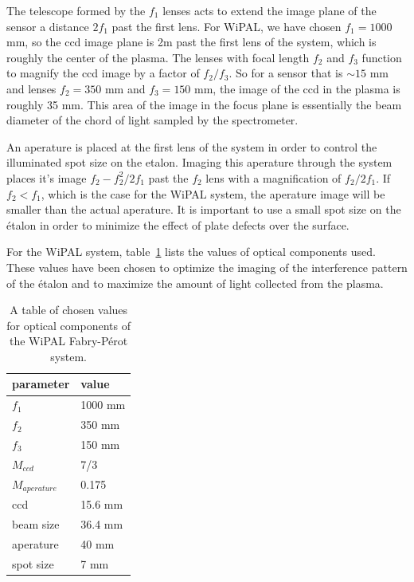 \documentclass{article}
\begin{document}
The telescope formed by the $f_{1}$ lenses acts to extend the image plane of the sensor a distance $2f_{1}$ past the first lens. For WiPAL, we have chosen $f_{1}=1000$ mm, so the ccd image plane is 2m past the first lens of the system, which is roughly the center of the plasma. The lenses with focal length $f_{2}$ and $f_{3}$ function to magnify the ccd image by a factor of $f_{2}/f_{3}$. So for a sensor that is $\sim15$ mm and lenses $f_{2}=350$ mm and $f_{3}=150$ mm, the image of the ccd in the plasma is roughly 35 mm. This area of the image in the focus plane is essentially the beam diameter of the chord of light sampled by the spectrometer.

An aperature is placed at the first lens of the system in order to control the illuminated spot size on the etalon. Imaging this aperature through the system places it's image $f_{2}-f_{2}^{2}/2f_{1}$  past the $f_{2}$ lens with a magnification of $f_{2}/2f_{1}$. If $f_{2}<f_{1}$, which is the case for the WiPAL system, the aperature image will be smaller than the actual aperature. It is important to use a small spot size on the \'{e}talon in order to minimize the effect of plate defects over the surface.

For the WiPAL system, table~\ref{tab:system} lists the values of optical components used. These values have been chosen to optimize the imaging of the interference pattern of the \'{e}talon and to maximize the amount of light collected from the plasma. 
\begin{table}
\begin{center}
\begin{tabular}{l | l }
parameter & value \\\hline
$f_{1}$ & 1000 mm\\
$f_{2}$ & 350 mm\\
$f_{3}$ & 150 mm\\
$M_{ccd}$ & 7/3 \\
$M_{aperature}$ & 0.175\\
ccd & 15.6 mm\\
beam size & 36.4 mm\\
aperature & 40 mm\\
spot size & 7 mm
\end{tabular}
\caption{A table of chosen values for optical components of the WiPAL Fabry-P\'{e}rot system.}
\label{tab:system}
\end{center}
\end{table}


%

%

\end{document}
